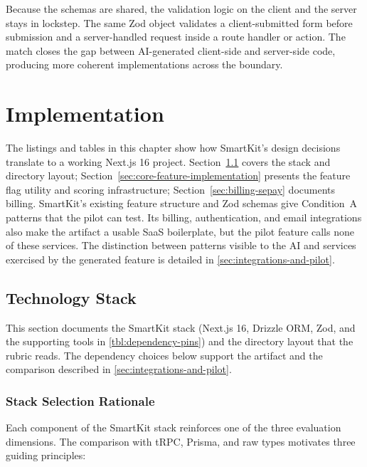 \documentclass[12pt,a4paper]{report}
\begin{document}
Because the schemas are shared, the validation logic on the client and the server stays in lockstep. The same Zod object validates a client-submitted form before submission and a server-handled request inside a route handler or action. The match closes the gap between AI-generated client-side and server-side code, producing more coherent implementations across the boundary.

\chapter{Implementation}
\label{sec:implementation}

The listings and tables in this chapter show how SmartKit's design decisions translate to a working Next.js 16 project. Section~\ref{sec:technology-stack} covers the stack and directory layout; Section~\ref{sec:core-feature-implementation} presents the feature flag utility and scoring infrastructure; Section~\ref{sec:billing-sepay} documents billing. SmartKit's existing feature structure and Zod schemas give Condition~A patterns that the pilot can test. Its billing, authentication, and email integrations also make the artifact a usable SaaS boilerplate, but the pilot feature calls none of these services. The distinction between patterns visible to the AI and services exercised by the generated feature is detailed in \autoref{sec:integrations-and-pilot}.

\section{Technology Stack}
\label{sec:technology-stack}

This section documents the SmartKit stack (Next.js 16, Drizzle ORM, Zod, and the supporting tools in \autoref{tbl:dependency-pins}) and the directory layout that the rubric reads. The dependency choices below support the artifact and the comparison described in \autoref{sec:integrations-and-pilot}.

\subsection{Stack Selection Rationale}
\label{sec:stack-rationale}

Each component of the SmartKit stack reinforces one of the three evaluation dimensions. The comparison with tRPC, Prisma, and raw types motivates three guiding principles:
\end{document}

